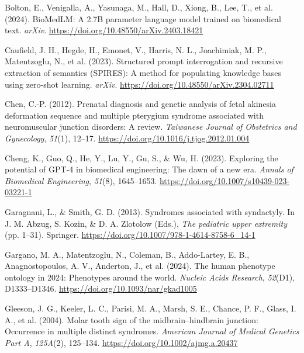 \documentclass[
]{agujournal2019}
\newlength{\cslhangindent}
\newenvironment{CSLReferences}[2] %
 {\begin{list}{}{%
  \setlength{\itemindent}{0pt}
  \setlength{\leftmargin}{0pt}
  \setlength{\parsep}{0pt}
  \ifodd #1
   \setlength{\leftmargin}{\cslhangindent}
   \setlength{\itemindent}{-1\cslhangindent}
  \fi
  \setlength{\itemsep}{#2\baselineskip}}}
 {\end{list}}
\begin{document}
\label{refs}
\begin{CSLReferences}{1}{0}
\vspace{1em}

Bolton, E., Venigalla, A., Yasunaga, M., Hall, D., Xiong, B., Lee, T.,
et al. (2024). BioMedLM: A 2.7B parameter language model trained on
biomedical text. \emph{arXiv}.
\url{https://doi.org/10.48550/arXiv.2403.18421}

Caufield, J. H., Hegde, H., Emonet, V., Harris, N. L., Joachimiak, M.
P., Matentzoglu, N., et al. (2023). Structured prompt interrogation and
recursive extraction of semantics (SPIRES): A method for populating
knowledge bases using zero-shot learning. \emph{arXiv}.
\url{https://doi.org/10.48550/arXiv.2304.02711}

Chen, C.-P. (2012). Prenatal diagnosis and genetic analysis of fetal
akinesia deformation sequence and multiple pterygium syndrome associated
with neuromuscular junction disorders: A review. \emph{Taiwanese Journal
of Obstetrics and Gynecology}, \emph{51}(1), 12--17.
\url{https://doi.org/10.1016/j.tjog.2012.01.004}

Cheng, K., Guo, Q., He, Y., Lu, Y., Gu, S., \& Wu, H. (2023). Exploring
the potential of GPT-4 in biomedical engineering: The dawn of a new era.
\emph{Annals of Biomedical Engineering}, \emph{51}(8), 1645--1653.
\url{https://doi.org/10.1007/s10439-023-03221-1}

Garagnani, L., \& Smith, G. D. (2013). Syndromes associated with
syndactyly. In J. M. Abzug, S. Kozin, \& D. A. Zlotolow (Eds.),
\emph{The pediatric upper extremity} (pp. 1--31). Springer.
\url{https://doi.org/10.1007/978-1-4614-8758-6_14-1}

Gargano, M. A., Matentzoglu, N., Coleman, B., Addo-Lartey, E. B.,
Anagnostopoulos, A. V., Anderton, J., et al. (2024). The human phenotype
ontology in 2024: Phenotypes around the world. \emph{Nucleic Acids
Research}, \emph{52}(D1), D1333--D1346.
\url{https://doi.org/10.1093/nar/gkad1005}

Gleeson, J. G., Keeler, L. C., Parisi, M. A., Marsh, S. E., Chance, P.
F., Glass, I. A., et al. (2004). Molar tooth sign of the
midbrain--hindbrain junction: Occurrence in multiple distinct syndromes.
\emph{American Journal of Medical Genetics Part A}, \emph{125A}(2),
125--134. \url{https://doi.org/10.1002/ajmg.a.20437}


\end{CSLReferences}
\end{document}
